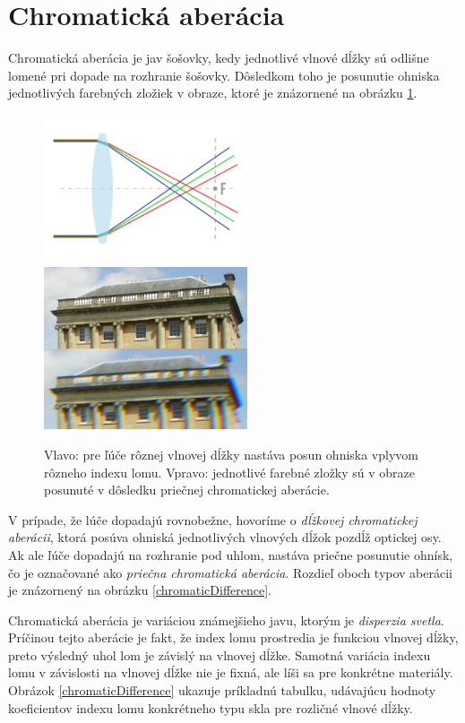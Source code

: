 \section{Chromatická aberácia}
Chromatická aberácia je jav šošovky, kedy jednotlivé vlnové dĺžky sú odlišne lomené pri dopade na
rozhranie šošovky. Dôsledkom toho je posunutie ohniska jednotlivých farebných zložiek v obraze, ktoré je
znázornené na obrázku \ref{chromaticFocus}. 

\begin{figure}[h]
\centering
\label{chromaticFocus}
\includegraphics[width=6cm]{obrazky-figures/chromaticFocus.jpg}
\includegraphics[width=6cm]{obrazky-figures/chromaticAberrationWikipedia.jpg}
\caption{Vlavo: pre ľúče rôznej vlnovej dĺžky nastáva posun ohniska vplyvom rôzneho indexu lomu. Vpravo:
   jednotlivé farebné zložky sú v obraze posunuté v dôsledku priečnej chromatickej aberácie.}
\end{figure}

V prípade, že lúče dopadajú rovnobežne, hovoríme o
\textit{dĺžkovej chromatickej aberácii}, ktorá posúva ohniská jednotlivých vlnových dĺžok pozdĺž optickej
osy. Ak ale ľúče dopadajú na rozhranie pod uhlom, nastáva priečne posunutie ohnísk, čo je označované
ako \textit{priečna chromatická aberácia}. Rozdieľ oboch typov aberácii je znázornený na obrázku
\ref{chromaticDifference}.

Chromatická aberácia je variáciou známejšieho javu, ktorým je \textit{disperzia svetla}.
Príčinou tejto aberácie je fakt, že index lomu prostredia je funkciou vlnovej dĺžky, preto výsledný
uhol lom je závislý na vlnovej dĺžke. Samotná variácia indexu lomu v závislosti na vlnovej dĺžke nie
je fixná, ale líši sa pre konkrétne materiály. Obrázok \ref{chromaticDifference} ukazuje príkladnú
tabulku, udávajúcu hodnoty koeficientov indexu lomu konkrétneho typu skla pre rozličné vlnové dĺžky.

